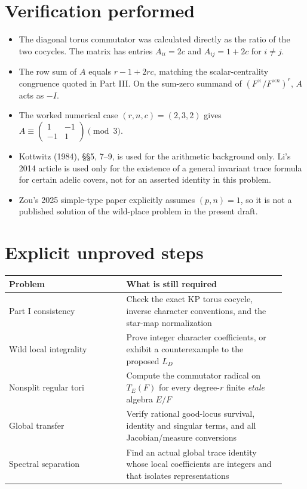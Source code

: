 \documentclass[11pt]{article}
\begin{document}
\section*{Verification performed}
\begin{itemize}
\item The diagonal torus commutator was calculated directly as the
ratio of the two cocycles. The matrix has entries $A_{ii}=2c$ and
$A_{ij}=1+2c$ for $i\ne j$.
\item The row sum of $A$ equals $r-1+2rc$, matching the
scalar-centrality congruence quoted in Part III. On the sum-zero
summand of $(F^\times/F^{\times n})^r$, $A$ acts as $-I$.
\item The worked numerical case $(r,n,c)=(2,3,2)$ gives
$A\equiv\left(\begin{smallmatrix}1&-1\\-1&1\end{smallmatrix}\right)\pmod3$.
\item Kottwitz (1984), \S\S5, 7--9, is used for the arithmetic
background only. Li's 2014 article is used only for the existence of
a general invariant trace formula for certain adelic covers, not for
an asserted identity in this problem.
\item Zou's 2025 simple-type paper explicitly assumes
$(p,n)=1$, so it is not a published solution of the wild-place
problem in the present draft.
\end{itemize}

\section*{Explicit unproved steps}
\begin{center}\small
\begin{tabular}{@{}p{0.39\linewidth}p{0.53\linewidth}@{}}
\toprule
Problem & What is still required\\\midrule
Part I consistency & Check the exact KP torus cocycle, inverse character conventions, and the star-map normalization\\
Wild local integrality & Prove integer character coefficients, or exhibit a counterexample to the proposed $L_D$\\
Nonsplit regular tori & Compute the commutator radical on $T_E(F)$ for every degree-$r$ finite \emph{etale} algebra $E/F$\\
Global transfer & Verify rational good-locus survival, identity and singular terms, and all Jacobian/measure conversions\\
Spectral separation & Find an actual global trace identity whose local coefficients are integers and that isolates representations\\
\bottomrule
\end{tabular}
\end{center}
\end{document}
